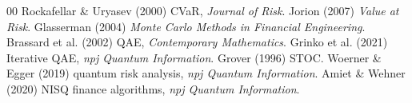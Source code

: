 \documentclass[conference]{IEEEtran}
\begin{document}
\begin{thebibliography}{00}
 Rockafellar \& Uryasev (2000) CVaR, \emph{Journal of Risk}.
 Jorion (2007) \emph{Value at Risk}.
 Glasserman (2004) \emph{Monte Carlo Methods in Financial Engineering}.
 Brassard et al. (2002) QAE, \emph{Contemporary Mathematics}.
 Grinko et al. (2021) Iterative QAE, \emph{npj Quantum Information}.
 Grover (1996) STOC.
 Woerner \& Egger (2019) quantum risk analysis, \emph{npj Quantum Information}.
 Amiet \& Wehner (2020) NISQ finance algorithms, \emph{npj Quantum Information}.
\end{thebibliography}
\end{document}
